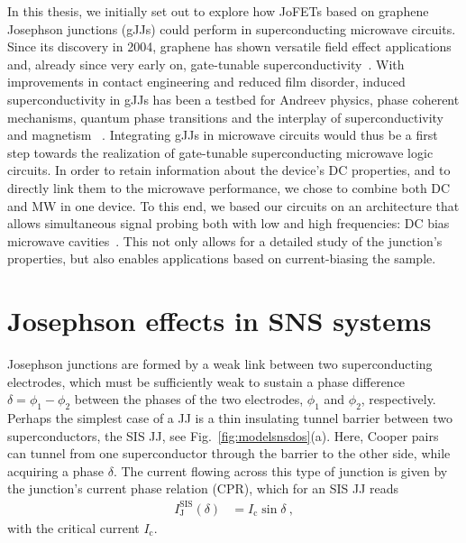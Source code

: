 In this thesis, we initially set out to explore how JoFETs based on graphene Josephson junctions (gJJs) could perform in superconducting microwave circuits.
%
Since its discovery in 2004, graphene has shown versatile field effect applications and, already since very early on, gate-tunable superconductivity~\cite{novoselovElectricFieldEffect2004c,heerscheBipolarSupercurrentGraphene2007a}.
%
With improvements in contact engineering and reduced film disorder, induced superconductivity in gJJs has been a testbed for Andreev physics, phase coherent mechanisms, quantum phase transitions and the interplay of superconductivity and magnetism ~\cite{leeProximityCouplingSuperconductorgraphene2018a}.
%
Integrating gJJs in microwave circuits would thus be a first step towards the realization of gate-tunable superconducting microwave logic circuits.
%
In order to retain information about the device's DC properties, and to directly link them to the microwave performance, we chose to combine both DC and MW in one device.
%
To this end, we based our circuits on an architecture that allows simultaneous signal probing both with low and high frequencies: DC bias microwave cavities~\cite{bosmanBroadbandArchitectureGalvanically2015c}.
%
This not only allows for a detailed study of the junction's properties, but also enables applications based on current-biasing the sample.







\section{Josephson effects in SNS systems}

Josephson junctions are formed by a weak link between two superconducting electrodes, which must be sufficiently weak to sustain a phase difference $\delta=\phi_1-\phi_2$ between the phases of the two electrodes, $\phi_1$ and $\phi_2$, respectively.
%
Perhaps the simplest case of a JJ is a thin insulating tunnel barrier between two superconductors, the SIS JJ, see Fig.~\ref{fig:modelsnsdos}(a).
%
Here, Cooper pairs can tunnel from one superconductor through the barrier to the other side, while acquiring a phase $\delta$.
%
The current flowing across this type of junction is given by the junction's current phase relation (CPR), which for an SIS JJ reads
%
\begin{align}
I_\text{J}^\text{SIS}(\delta) &= I_\text{c}\sin\delta \ ,
\end{align}
%
with the critical current $I_\text{c}$.

